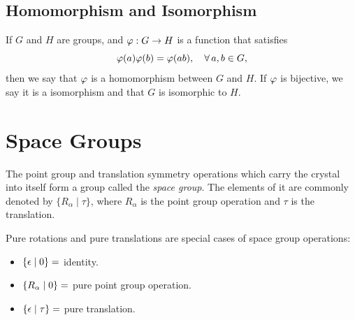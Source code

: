\n\n\n



%
%

\subsection{Homomorphism and Isomorphism}

If $G$ and $H$ are groups, and $\varphi: G \to H$ is a function that satisfies
$$
\varphi(a)\varphi(b) = \varphi(ab), \quad \forall \, a,b \in G,
$$
then we say that $\varphi$ is a homomorphism between $G$ and $H$. If $\varphi$ is bijective, we say it is a isomorphism and that $G$ is isomorphic to $H$.


\section{Space Groups}

The point group and translation symmetry operations which carry the crystal into itself form a group called the \textit{space group}. The elements of it are commonly denoted by  $\{ R_\alpha \mid \tau \} $, where $R_\alpha$ is the point group operation and $\tau$ is the translation.

Pure rotations and pure translations are special cases of space group operations:
\begin{itemize}
\item $\{ \epsilon \mid 0 \} =$ identity.
\item $\{ R_\alpha \mid 0 \} =$ pure point group operation.
\item $\{ \epsilon \mid \tau \} =$ pure translation.
\end{itemize}


